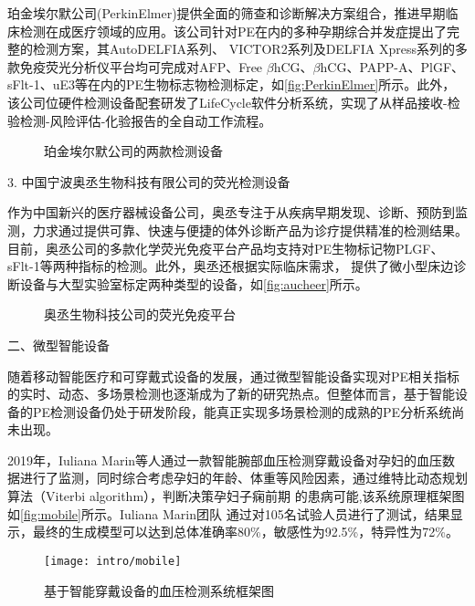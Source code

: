 珀金埃尔默公司(PerkinElmer)提供全面的筛查和诊断解决方案组合，推进早期临床检测在成医疗领域的应用。该公司针对PE在内的多种孕期综合并发症提出了完整的检测方案，其AutoDELFIA系列、
VICTOR2系列及DELFIA Xpress系列的多款免疫荧光分析仪平台\cite{perkinelmer2021}均可完成对AFP、Free $\beta$hCG、$\beta$hCG、PAPP-A、PlGF、
sFlt-1、uE3等在内的PE生物标志物检测标定，如\autoref{fig:PerkinElmer}所示。此外，该公司位硬件检测设备配套研发了LifeCycle软件分析系统，实现了从样品接收-检验检测-风险评估-化验报告的全自动工作流程。
\begin{figure}[h]
    \centering
    \quad
    \caption{\label{fig:PerkinElmer}珀金埃尔默公司的两款检测设备}
\end{figure}

3. 中国宁波奥丞生物科技有限公司的荧光检测设备

作为中国新兴的医疗器械设备公司，奥丞专注于从疾病早期发现、诊断、预防到监测，力求通过提供可靠、快速与便捷的体外诊断产品为诊疗提供精准的检测结果。
目前，奥丞公司的多款化学荧光免疫平台产品均支持对PE生物标记物PLGF、sFlt-1等两种指标的检测\cite{aucheer2021}。此外，奥丞还根据实际临床需求，
提供了微小型床边诊断设备与大型实验室标定两种类型的设备，如\autoref{fig:aucheer}所示。
\begin{figure}[h]
    \centering
    \quad
    \caption{\label{fig:aucheer}奥丞生物科技公司的荧光免疫平台}
\end{figure}


二、微型智能设备

随着移动智能医疗和可穿戴式设备的发展，通过微型智能设备实现对PE相关指标的实时、动态、多场景检测也逐渐成为了新的研究热点。但整体而言，基于智能设备的PE检测设备仍处于研发阶段，能真正实现多场景检测的成熟的PE分析系统尚未出现。
% 

2019年，Iuliana Marin等人\cite{Marin2019,Marin2020}通过一款智能腕部血压检测穿戴设备对孕妇的血压数据进行了监测，同时综合考虑孕妇的年龄、体重等风险因素，通过维特比动态规划算法（Viterbi algorithm），判断决策孕妇子痫前期
的患病可能,该系统原理框架图如\autoref{fig:mobile}所示。Iuliana Marin团队
通过对105名试验人员进行了测试，结果显示，最终的生成模型可以达到总体准确率80\%，敏感性为92.5\%，特异性为72\%\cite{Marin2019}。
\begin{figure}[htbp]
    \centering
    \texttt{[image: intro/mobile]}
    \caption[基于智能穿戴设备的血压检测系统框架图]{\label{fig:mobile}基于智能穿戴设备的血压检测系统框架图\cite{Marin2019,Marin2020}}
\end{figure}

